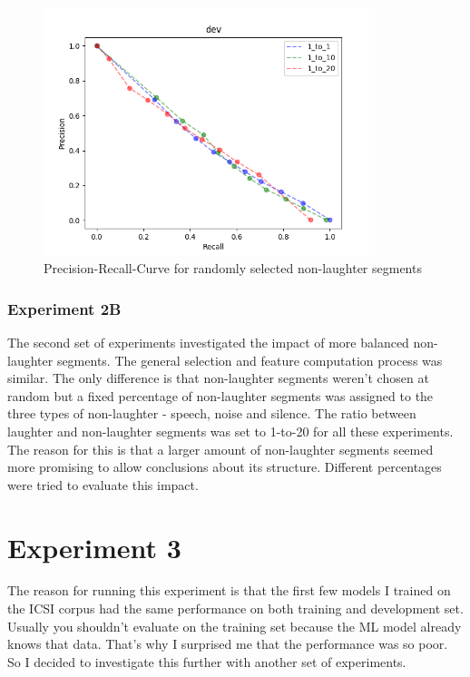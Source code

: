 \documentclass[bsc,frontabs,parskip,deptreport]{infthesis}
\begin{document}
\begin{figure}
    \centering
    \includegraphics[width = 3.8in]{imgs/prec-recall/random/dev_compare_class_balance_dev_set.png}
    \caption{Precision-Recall-Curve for randomly selected non-laughter segments}
    \label{fig:prec-recall-rand}
\end{figure}

\subsubsection{Experiment 2B}
The second set of experiments investigated the impact of more balanced non-laughter segments. The general selection and feature computation process was similar. The only difference is that non-laughter segments weren't chosen at random but a fixed percentage of non-laughter segments was assigned to the three types of non-laughter - speech, noise and silence.
The ratio between laughter and non-laughter segments was set to 1-to-20 for all these experiments. The reason for this is that a larger amount of non-laughter segments seemed more promising to allow conclusions about its structure. 
Different percentages were tried to evaluate this impact.

\section{Experiment 3}
The reason for running this experiment is that the first few models I trained on the ICSI corpus had the same performance on both training and development set.
Usually you shouldn't evaluate on the training set because the ML model already knows that data. That's why I surprised me that the performance was so poor. So I decided to investigate this further with another set of experiments.
\end{document}
